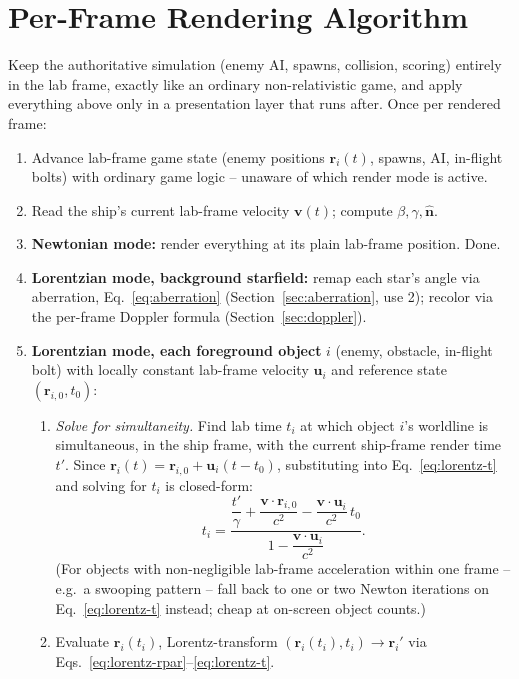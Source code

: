 \documentclass[11pt]{article}
\newcommand{\vb}[1]{\mathbf{#1}}
\newcommand{\uv}[1]{\hat{\mathbf{#1}}}
\begin{document}
\section{Per-Frame Rendering Algorithm}
\label{sec:algorithm}

Keep the authoritative simulation (enemy AI, spawns, collision, scoring) entirely in the lab frame, exactly like an ordinary non-relativistic game, and apply everything above only in a presentation layer that runs after. Once per rendered frame:

\begin{enumerate}[leftmargin=1.7em]
  \item Advance lab-frame game state (enemy positions $\vb r_i(t)$, spawns, AI, in-flight bolts) with ordinary game logic -- unaware of which render mode is active.
  \item Read the ship's current lab-frame velocity $\vb v(t)$; compute $\beta,\gamma,\uv n$.
  \item \textbf{Newtonian mode:} render everything at its plain lab-frame position. Done.
  \item \textbf{Lorentzian mode, background starfield:} remap each star's angle via aberration, Eq.~\eqref{eq:aberration} (Section~\ref{sec:aberration}, use 2); recolor via the per-frame Doppler formula (Section~\ref{sec:doppler}).
  \item \textbf{Lorentzian mode, each foreground object} $i$ (enemy, obstacle, in-flight bolt) with locally constant lab-frame velocity $\vb u_i$ and reference state $(\vb r_{i,0}, t_0)$:
  \begin{enumerate}
    \item \emph{Solve for simultaneity.} Find lab time $t_i$ at which object $i$'s worldline is simultaneous, in the ship frame, with the current ship-frame render time $t'$. Since $\vb r_i(t)=\vb r_{i,0}+\vb u_i(t-t_0)$, substituting into Eq.~\eqref{eq:lorentz-t} and solving for $t_i$ is closed-form:
    \begin{equation}
      t_i = \frac{\dfrac{t'}{\gamma} + \dfrac{\vb v\cdot\vb r_{i,0}}{c^2} - \dfrac{\vb v \cdot \vb u_i}{c^2}\,t_0}{1 - \dfrac{\vb v\cdot\vb u_i}{c^2}}.
      \label{eq:simultaneity-solve}
    \end{equation}
    (For objects with non-negligible lab-frame acceleration within one frame -- e.g.\ a swooping pattern -- fall back to one or two Newton iterations on Eq.~\eqref{eq:lorentz-t} instead; cheap at on-screen object counts.)
    \item Evaluate $\vb r_i(t_i)$, Lorentz-transform $(\vb r_i(t_i), t_i) \to \vb r_i'$ via Eqs.~\eqref{eq:lorentz-rpar}--\eqref{eq:lorentz-t}.

\end{enumerate}
\end{enumerate}
\end{document}

